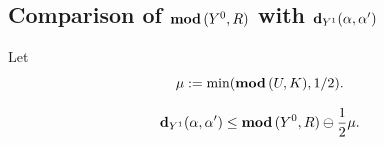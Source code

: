 
\subsection{Comparison of ${ \mathbf{mod}\, }(Y^0, R)$ with ${\mathbf{d}}_{Y^1}(\alpha, \alpha')$}

  Let  $$\mu := \min ({ \mathbf{mod}\, }(U, K), 1/2) .$$


\begin{lem}\label{observe}
    $${\mathbf{d}}_{Y^1}(\alpha, \alpha')\leq { \mathbf{mod}\, } (Y^0, R) \ominus \frac{1}{2} \mu.$$
\end{lem}

